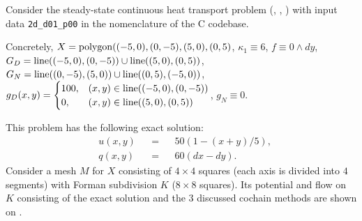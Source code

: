 \begin{example}
  Consider the steady-state continuous heat transport problem
  (,
   ,
   )
  with input data \verb|2d_d01_p00| in the nomenclature of the C codebase.

  Concretely,
    $X = {\rm polygon}((-5, 0), (0, -5), (5, 0), (0, 5)$,
    $\kappa_1 \equiv 6$,
    $f \equiv 0 \wedge d y$,
    $G_D = {\rm line}((-5, 0), (0, -5)) \cup {\rm line}((5, 0), (0, 5))$,
    $G_N = {\rm line}((0, -5), (5, 0)) \cup {\rm line}((0, 5), (-5, 0))$,
    $g_D(x, y) =
      \begin{cases}
        100, & (x, y) \in {\rm line}((-5, 0), (0, -5)) \\
        0, & (x, y) \in {\rm line}((5, 0), (0, 5))
      \end{cases}$,
    $g_N \equiv 0$.

  This problem has the following exact solution:
  \begin{subequations}
    \begin{alignat}{3}
      & u(x, y) && = && 50 (1 - (x + y) / 5), \\
      & q(x, y) && = && 60 (d x - d y).
    \end{alignat}
  \end{subequations}
  Consider a mesh $M$ for $X$ consisting of $4 \times 4$ squares (each axis is
  divided into $4$ segments) with Forman subdivision $K$ ($8 \times 8$ squares).
  Its potential and flow on $K$ consisting of the exact solution and the $3$
  discussed cochain methods are shown on
  .
\end{example}
